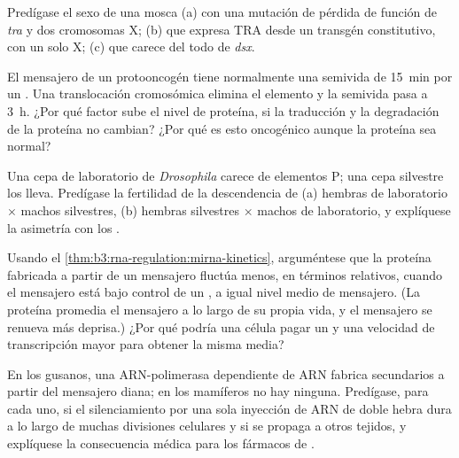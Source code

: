 \begin{exercise}[$\star\star$]\label{exo:b3:rna-regulation:7}
Predígase el sexo de una mosca (a) con una mutación de pérdida de función
de \emph{tra} y dos cromosomas X; (b) que expresa TRA desde un transgén
constitutivo, con un solo X; (c) que carece del todo de \emph{dsx}.
\end{exercise}

\begin{exercise}[$\star\star$]\label{exo:b3:rna-regulation:8}
El mensajero de un protooncogén tiene normalmente una semivida de
\qty{15}{min} por un . Una translocación cromosómica
elimina el elemento y la semivida pasa a \qty{3}{h}. ¿Por qué factor sube
el nivel de proteína, si la traducción y la degradación de la proteína no
cambian? ¿Por qué es esto oncogénico aunque la proteína sea normal?
\end{exercise}

\begin{exercise}[$\star\star$]\label{exo:b3:rna-regulation:9}
Una cepa de laboratorio de \emph{Drosophila} carece de elementos P; una
cepa silvestre los lleva. Predígase la fertilidad de la descendencia de
(a) hembras de laboratorio $\times$ machos silvestres, (b) hembras
silvestres $\times$ machos de laboratorio, y explíquese la asimetría con
los .
\end{exercise}

\begin{exercise}[$\star\star\star$]\label{exo:b3:rna-regulation:10}
Usando el \cref{thm:b3:rna-regulation:mirna-kinetics}, arguméntese que la
proteína fabricada a partir de un mensajero fluctúa menos, en términos
relativos, cuando el mensajero está bajo control de un , a igual
nivel medio de mensajero. (La proteína promedia el mensajero a lo largo
de su propia vida, y el mensajero se renueva más deprisa.) ¿Por qué
podría una célula pagar un  y una velocidad de transcripción
mayor para obtener la misma media?
\end{exercise}

\begin{exercise}[$\star\star\star$]\label{exo:b3:rna-regulation:11}
En los gusanos, una ARN-polimerasa dependiente de ARN fabrica 
secundarios a partir del mensajero diana; en los mamíferos no hay
ninguna. Predígase, para cada uno, si el silenciamiento por una sola
inyección de ARN de doble hebra dura a lo largo de muchas divisiones
celulares y si se propaga a otros tejidos, y explíquese la consecuencia
médica para los fármacos de .
\end{exercise}

